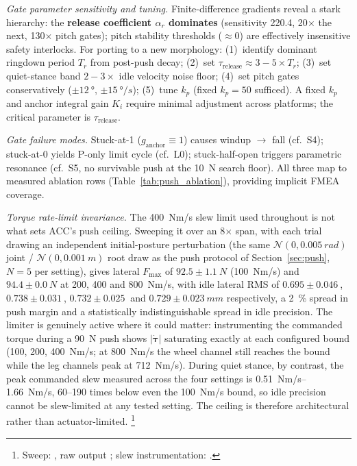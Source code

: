 \documentclass[a4paper,fleqn]{cas-dc}
\begin{document}
\emph{Gate parameter sensitivity and tuning.}
Finite-difference gradients reveal a stark hierarchy: the \textbf{release coefficient $\alpha_r$ dominates} (sensitivity 220.4, \num{20}$\times$ the next, \num{130}$\times$ pitch gates); pitch stability thresholds (${\approx}0$) are effectively insensitive safety interlocks.
For porting to a new morphology: (1)~identify dominant ringdown period $T_r$ from post-push decay; (2)~set $\tau_{\text{release}} {\approx} 3{-}5{\times}T_r$; (3)~set quiet-stance band $2{-}3{\times}$ idle velocity noise floor; (4)~set pitch gates conservatively ($\pm\SI{12}{\degree}$, $\pm\SI{15}{\degree/s}$); (5)~tune $k_p$ (fixed $k_p{=}50$ sufficed).
A fixed $k_p$ and anchor integral gain $K_i$ require minimal adjustment across platforms; the critical parameter is $\tau_{\text{release}}$.

\emph{Gate failure modes.}
Stuck-at-1 ($g_{\text{anchor}}{\equiv}1$) causes windup $\rightarrow$ fall (cf.\ S4); stuck-at-0 yields P-only limit cycle (cf.\ L0); stuck-half-open triggers parametric resonance (cf.\ S5, no survivable push at the \SI{10}{N} search floor). All three map to measured ablation rows (Table~\ref{tab:push_ablation}), providing implicit FMEA coverage.

\emph{Torque rate-limit invariance.}
The \SI{400}{Nm/s} slew limit used throughout is not what sets ACC's push
ceiling. Sweeping it over an \num{8}$\times$ span, with each trial drawing an
independent initial-posture perturbation (the same
$\mathcal{N}(0,\SI{0.005}{rad})$ joint / $\mathcal{N}(0,\SI{0.001}{m})$ root
draw as the push protocol of Section~\ref{sec:push}, $N{=}5$ per setting), gives
lateral $F_{\max}$ of $92.5{\pm}\SI{1.1}{N}$ (\SI{100}{Nm/s}) and
$94.4{\pm}\SI{0.0}{N}$ at \SI{200}{}, \SI{400}{} and \SI{800}{Nm/s}, with idle
lateral RMS of $0.695{\pm}\SI{0.046}{}$, $0.738{\pm}\SI{0.031}{}$,
$0.732{\pm}\SI{0.025}{}$ and $0.729{\pm}\SI{0.023}{mm}$ respectively, a \SI{2}{\percent} spread in push margin and a statistically indistinguishable
spread in idle precision.
The limiter is genuinely active where it could matter: instrumenting the
commanded torque during a \SI{90}{N} push shows $|\dot{\boldsymbol{\tau}}|$
saturating exactly at each configured bound (\SI{100}{}, \SI{200}{},
\SI{400}{Nm/s}; at \SI{800}{Nm/s} the wheel channel still reaches the bound
while the leg channels peak at \SI{712}{Nm/s}). During quiet stance, by
contrast, the peak commanded slew measured across the four settings is
\SIrange{0.51}{1.66}{Nm/s}, \numrange{60}{190} times below even the
\SI{100}{Nm/s} bound, so idle precision cannot be slew-limited at any tested
setting.
The ceiling is therefore architectural rather than actuator-limited.%
\footnote{Sweep: , raw output
; slew instrumentation:
.}
\end{document}
